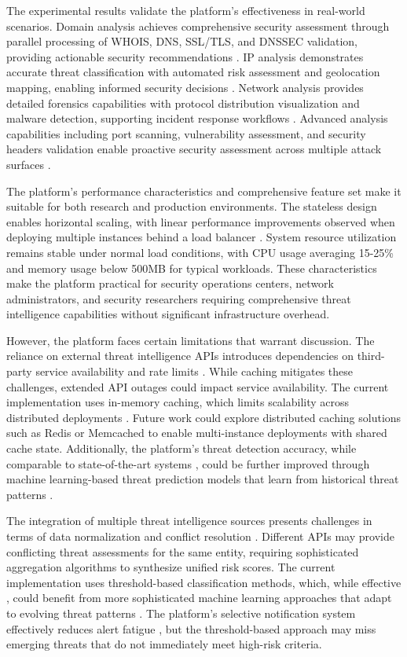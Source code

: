\documentclass[pdflatex,sn-mathphys-num]{sn-jnl}%
\theoremstyle{thmstyleone}%
\theoremstyle{thmstyletwo}%
\theoremstyle{thmstylethree}%
\begin{document}
The experimental results validate the platform's effectiveness in real-world scenarios. Domain analysis achieves comprehensive security assessment through parallel processing of WHOIS, DNS, SSL/TLS, and DNSSEC validation, providing actionable security recommendations \cite{bib5,bib9}. IP analysis demonstrates accurate threat classification with automated risk assessment and geolocation mapping, enabling informed security decisions \cite{bib5,bib13}. Network analysis provides detailed forensics capabilities with protocol distribution visualization and malware detection, supporting incident response workflows \cite{bib5}. Advanced analysis capabilities including port scanning, vulnerability assessment, and security headers validation enable proactive security assessment across multiple attack surfaces \cite{bib5,bib9}.

The platform's performance characteristics and comprehensive feature set make it suitable for both research and production environments. The stateless design enables horizontal scaling, with linear performance improvements observed when deploying multiple instances behind a load balancer \cite{bib7}. System resource utilization remains stable under normal load conditions, with CPU usage averaging 15-25\% and memory usage below 500MB for typical workloads. These characteristics make the platform practical for security operations centers, network administrators, and security researchers requiring comprehensive threat intelligence capabilities without significant infrastructure overhead.

However, the platform faces certain limitations that warrant discussion. The reliance on external threat intelligence APIs introduces dependencies on third-party service availability and rate limits \cite{bib7}. While caching mitigates these challenges, extended API outages could impact service availability. The current implementation uses in-memory caching, which limits scalability across distributed deployments \cite{bib17}. Future work could explore distributed caching solutions such as Redis or Memcached to enable multi-instance deployments with shared cache state. Additionally, the platform's threat detection accuracy, while comparable to state-of-the-art systems \cite{bib13,bib14}, could be further improved through machine learning-based threat prediction models that learn from historical threat patterns \cite{bib1,bib13}.

The integration of multiple threat intelligence sources presents challenges in terms of data normalization and conflict resolution \cite{bib4,bib12}. Different APIs may provide conflicting threat assessments for the same entity, requiring sophisticated aggregation algorithms to synthesize unified risk scores. The current implementation uses threshold-based classification methods, which, while effective \cite{bib13}, could benefit from more sophisticated machine learning approaches that adapt to evolving threat patterns \cite{bib1,bib13}. The platform's selective notification system effectively reduces alert fatigue \cite{bib2}, but the threshold-based approach may miss emerging threats that do not immediately meet high-risk criteria.
\end{document}

